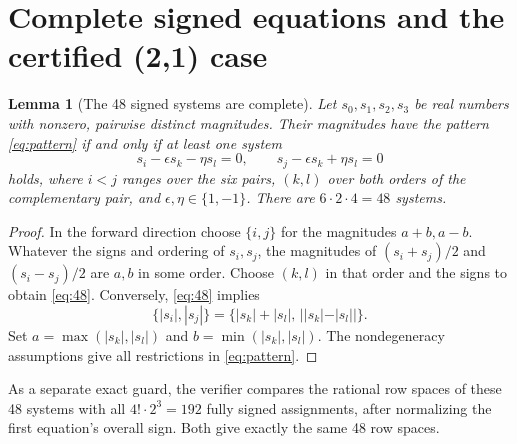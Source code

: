 \documentclass[11pt]{article}
\newtheorem{lemma}[theorem]{Lemma}
\theoremstyle{definition}\newtheorem{definition}[theorem]{Definition}
\theoremstyle{remark}\newtheorem{remark}[theorem]{Remark}
\begin{document}
\section{Complete signed equations and the certified (2,1) case}\label{sec:21}
\begin{lemma}[The 48 signed systems are complete]\label{lem:48}
Let $s_0,s_1,s_2,s_3$ be real numbers with nonzero, pairwise distinct magnitudes. Their magnitudes have the pattern \eqref{eq:pattern} if and only if at least one system
\begin{equation}\label{eq:48}
s_i-\epsilon s_k-\eta s_l=0,\qquad
s_j-\epsilon s_k+\eta s_l=0
\end{equation}
holds, where $i<j$ ranges over the six pairs, $(k,l)$ over both orders of the complementary pair, and $\epsilon,\eta\in\{1,-1\}$. There are $6\cdot2\cdot4=48$ systems.
\end{lemma}
\begin{proof}
In the forward direction choose $\{i,j\}$ for the magnitudes $a+b,a-b$. Whatever the signs and ordering of $s_i,s_j$, the magnitudes of $(s_i+s_j)/2$ and $(s_i-s_j)/2$ are $a,b$ in some order. Choose $(k,l)$ in that order and the signs to obtain \eqref{eq:48}. Conversely, \eqref{eq:48} implies
\[
\{|s_i|,|s_j|\}=\{|s_k|+|s_l|,\,||s_k|-|s_l||\}.
\]
Set $a=\max(|s_k|,|s_l|)$ and $b=\min(|s_k|,|s_l|)$. The nondegeneracy assumptions give all restrictions in \eqref{eq:pattern}.
\end{proof}
As a separate exact guard, the verifier compares the rational row spaces of these 48 systems with all $4!\cdot2^3=192$ fully signed assignments, after normalizing the first equation's overall sign. Both give exactly the same 48 row spaces.
\end{document}
